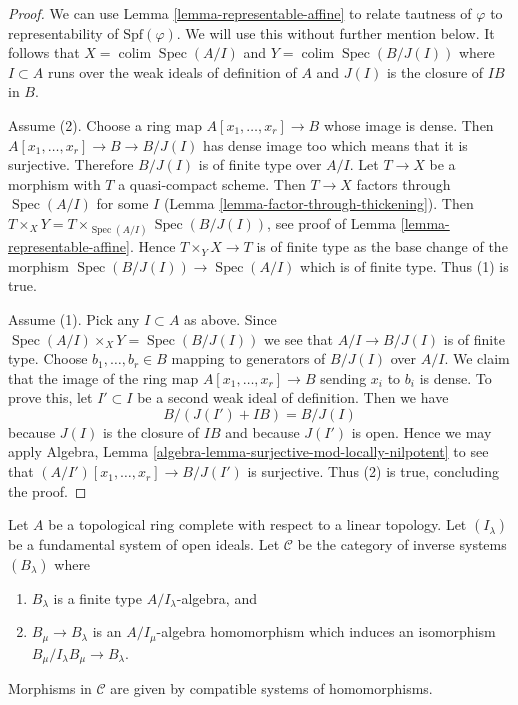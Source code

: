 \documentclass{stacks-project}
\theoremstyle{plain}
\theoremstyle{definition}
\theoremstyle{remark}
\numberwithin{equation}{subsection}
\def\colim{\mathop{\mathrm{colim}}\nolimits}
\def\Spec{\mathop{\mathrm{Spec}}}
\begin{document}
\begin{proof}
We can use Lemma \ref{lemma-representable-affine} to relate tautness of
$\varphi$ to representability of $\text{Spf}(\varphi)$. We will use this
without further mention below. It follows that $X = \colim \Spec(A/I)$
and $Y = \colim \Spec(B/J(I))$ where $I \subset A$ runs over the weak
ideals of definition of $A$ and $J(I)$ is the closure of $IB$ in $B$.

\medskip\noindent
Assume (2).
Choose a ring map $A[x_1, \ldots, x_r] \to B$ whose image is dense.
Then $A[x_1, \ldots, x_r] \to B \to B/J(I)$ has dense image too
which means that it is surjective. Therefore $B/J(I)$ is of
finite type over $A/I$. Let $T \to X$ be a morphism with
$T$ a quasi-compact scheme. Then $T \to X$ factors through
$\Spec(A/I)$ for some $I$ (Lemma \ref{lemma-factor-through-thickening}).
Then $T \times_X Y = T \times_{\Spec(A/I)} \Spec(B/J(I))$, see proof of
Lemma \ref{lemma-representable-affine}.
Hence $T \times_Y X \to T$ is of finite type as the base change of
the morphism $\Spec(B/J(I)) \to \Spec(A/I)$ which is of finite
type. Thus (1) is true.

\medskip\noindent
Assume (1). Pick any $I \subset A$ as above. Since
$\Spec(A/I) \times_X Y = \Spec(B/J(I))$ we see that $A/I \to B/J(I)$
is of finite type. Choose $b_1, \ldots, b_r \in B$
mapping to generators of $B/J(I)$ over $A/I$. We claim that the image
of the ring map $A[x_1, \ldots, x_r] \to B$ sending $x_i$ to $b_i$
is dense. To prove this, let $I' \subset I$ be a second weak ideal
of definition. Then we have
$$
B/(J(I') + IB) = B/J(I)
$$
because $J(I)$ is the closure of $IB$ and because $J(I')$ is open.
Hence we may apply Algebra, Lemma
\ref{algebra-lemma-surjective-mod-locally-nilpotent}
to see that $(A/I')[x_1, \ldots, x_r] \to B/J(I')$ is surjective.
Thus (2) is true, concluding the proof.
\end{proof}

\noindent
Let $A$ be a topological ring complete with respect to a linear
topology. Let $(I_\lambda)$ be a fundamental system of open ideals.
Let $\mathcal{C}$ be the category of inverse systems $(B_\lambda)$ where
\begin{enumerate}
\item $B_\lambda$ is a finite type $A/I_\lambda$-algebra, and
\item $B_\mu \to B_\lambda$ is an $A/I_\mu$-algebra homomorphism
which induces an isomorphism $B_\mu/I_\lambda B_\mu \to B_\lambda$.
\end{enumerate}
Morphisms in $\mathcal{C}$ are given by compatible systems of homomorphisms.
\end{document}
